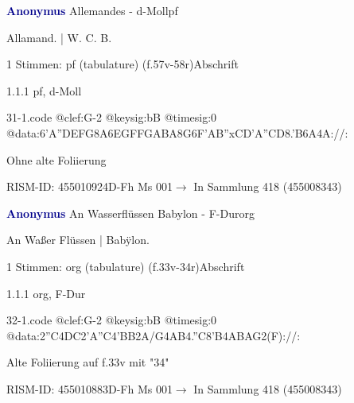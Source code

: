 \documentclass[twocolumn]{book}
\begin{document}
\par \vspace{7pt} \textcolor{darkblue}{\textbf{Anonymus  }}\hfillplus{\textbf{[31]}}\newline Allemandes - d-Moll\newline pf
\par \begin{itshape}[f.57v, at left:] Allamand. | W. C. B.\end{itshape} 
\par \textcolor{darkblue}{}  1 Stimmen: pf (tabulature)  (f.57v-58r)\newline Abschrift
\par 1.1.1  pf, d-Moll  
\begin{filecontents*}{31-1.code}
@clef:G-2
@keysig:bB
@timesig:0
@data:6'A{''DEFG}{8A6EG}{FFGA}{BA8G}{6F'AB''xC}{D'A''CD}{8.'B6A}4A://:
\end{filecontents*}
\newline
%
\par Ohne alte Foliierung
\par RISM-ID: 455010924\newline D-Fh  Ms 001\newline $\rightarrow$ In Sammlung 418 (455008343)
      
\par \vspace{7pt} \textcolor{darkblue}{\textbf{Anonymus  }}\hfillplus{\textbf{[32]}}\newline An Wasserflüssen Babylon - F-Dur\newline org
\par \begin{itshape}[f.33v, at left:] An Waßer Flüssen | Babÿlon.\end{itshape} 
\par \textcolor{darkblue}{}  1 Stimmen: org (tabulature)  (f.33v-34r)\newline Abschrift
\par 1.1.1  org, F-Dur  
\begin{filecontents*}{32-1.code}
@clef:G-2
@keysig:bB
@timesig:0
@data:2''C4DC2'A''C4'BB2A/G4AB4.''C8'B4ABAG2(F)://:
\end{filecontents*}
\newline
%
\par Alte Foliierung auf f.33v mit "34"
\par RISM-ID: 455010883\newline D-Fh  Ms 001\newline $\rightarrow$ In Sammlung 418 (455008343)
      
\end{document}
